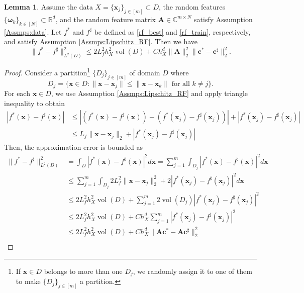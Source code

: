 \documentclass[11pt,twoside]{article}
\theoremstyle{plain}
\theoremstyle{definition}
\newtheorem{lemma}{Lemma}[section]
\theoremstyle{remark}
\newcommand{\R}{\mathbb{R}}
\newcommand{\C}{\mathbb{C}}
\newcommand{\Ab}{\mathbf{A}}
\newcommand{\xb}{\mathbf{x}}
\newcommand{\cb}{\mathbf{c}}
\newcommand{\vol}{\mathop{\mathrm{vol}}}
\newcommand{\omegab}{\boldsymbol\omega}
\begin{document}
\begin{lemma}
\label{lem_second_term}
Assume the data $X = \{\xb_j\}_{j\in[m]} \subset D$, the random features $\{ \omegab_k\}_{k\in[N]} \subset\R^d$, and the random feature matrix $\Ab\in\C^{m\times N}$ satisfy Assumption \ref{Assmps:data}.
Let $f^*$ and $f^\sharp$ be defined as \eqref{rf_best} and \eqref{rf_train}, respectively, and satisfy Assumption \ref{Assmps:Lipschitz_RF}. Then we have
\begin{equation}
\| f^* - f^\sharp\|_{L^2(D)}^2 \leq 2L_f^2h_X^2\vol(D) + Ch_X^d\|\Ab\|_2^2 \| \cb^* - \cb^\sharp\|_2^2.
\end{equation}
\end{lemma}
\begin{proof} 
Consider a partition\footnote{If $\xb\in D$ belongs to more than one $D_j$, we randomly assign it to one of them to make $\{D_j\}_{j\in[m]}$ a partition. } $\{ D_j \}_{j\in[m]}$ of domain $D$ where 
\begin{equation*}
D_j = \{\xb\in D: \|\xb-\xb_j\| \leq \|\xb-\xb_k\| \mbox{ for all } k\neq j \}.
\end{equation*}
For each $\xb\in D$, we use Assumption \ref{Assmps:Lipschitz_RF} and apply triangle inequality to obtain
\begin{equation*}
\begin{aligned}
|f^*(\xb) - f^\sharp(\xb)| &\leq \left| \left(f^*(\xb) - f^\sharp(\xb)\right) - \left(f^*(\xb_j) - f^\sharp(\xb_j)\right)\right| + \left|f^*(\xb_j) - f^\sharp(\xb_j)\right| \\
& \leq L_f\|\xb-\xb_j\|_2 + \left|f^*(\xb_j) - f^\sharp(\xb_j)\right|
\end{aligned}
\end{equation*}
Then, the approximation error is bounded as
\begin{equation}
\label{riemann_error}
\begin{aligned}
\|f^* - f^\sharp\|^2_{L^2(D)} &= \int_{D} \left|f^*(\xb)-f^\sharp(\xb)\right|^2 d\xb = \sum_{j=1}^m \int_{D_j} \left|f^*(\xb)-f^\sharp(\xb)\right|^2 d\xb \\
& \leq \sum_{j=1}^m \int_{D_j} 2L_f^2\|\xb-\xb_j\|_2^2 + 2\left|f^*(\xb_j) - f^\sharp(\xb_j)\right|^2 d\xb \\
& \leq 2L_f^2h_X^2\vol(D) + \sum_{j=1}^m 2\vol(D_j)\left|f^*(\xb_j) - f^\sharp(\xb_j)\right|^2 \\
& \leq 2L_f^2h_X^2\vol(D) + Ch_X^d\sum_{j=1}^m \left|f^*(\xb_j) - f^\sharp(\xb_j)\right|^2 \\
& \leq 2L_f^2h_X^2\vol(D) + Ch_X^d\|\Ab\cb^* - \Ab\cb^\sharp\|_2^2 \\

\end{aligned}
\end{equation}
\end{proof}
\end{document}
